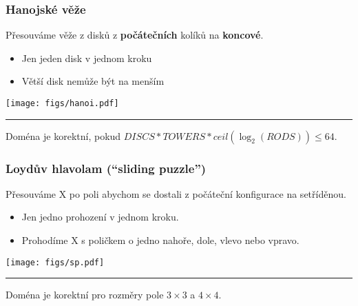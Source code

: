 \documentclass[usenames,dvipsnames,9pt]{beamer}
\begin{document}
\begin{frame}
  \frametitle{Hanojské věže}
  
  Přesouváme věže z disků z {\bf počátečních} kolíků na {\bf koncové}.
  
  \begin{itemize}
  \item Jen jeden disk v jednom kroku
  \item Větší disk nemůže být na menším
  \end{itemize}
  
  \vspace{1em}

\begin{center}
\texttt{[image: figs/hanoi.pdf]}
\end{center}

\vspace{1em}\hrule\vspace{1em}

\faWarning\hspace{3pt} Doména je korektní, pokud $DISCS*TOWERS*ceil(\log_2(RODS)) \leq 64$.

\end{frame}

\begin{frame}
  \frametitle{Loydův hlavolam (``sliding puzzle'')}
  
  Přesouváme X po poli abychom se dostali z počáteční konfigurace na setříděnou.
  
  \begin{itemize}
  \item Jen jedno prohození v jednom kroku.
  \item Prohodíme X s poličkem o jedno nahoře, dole, vlevo nebo vpravo.
  \end{itemize}
  
  \vspace{1em}

\begin{center}
\texttt{[image: figs/sp.pdf]}
\end{center}

\vspace{1em}\hrule\vspace{1em}

\faWarning\hspace{3pt} Doména je korektní pro rozměry pole $3\times 3$ a $4\times 4$.

\end{frame}
\end{document}
